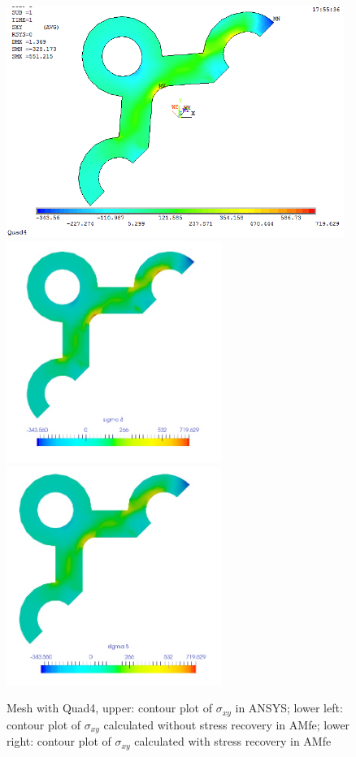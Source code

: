 \begin{figure}[htbp]
	\begin{center}
		\includegraphics[width=11cm,clip]{Quad4_Sxy.png} 	
		\includegraphics[width=7cm,clip]{Quad4_Sxy_PD.png} 	
		\includegraphics[width=7cm,clip]{Quad4_Sxy_P.png} 		
		\caption{Mesh with Quad4, upper: contour plot of $\sigma_{xy}$ in ANSYS; lower left: contour plot of $\sigma_{xy}$ calculated without stress recovery in AMfe; lower right: contour plot of $\sigma_{xy}$ calculated with stress recovery in AMfe} \label{fig: Quad4_Sxy}
	\end{center}
\end{figure}
\clearpage 

